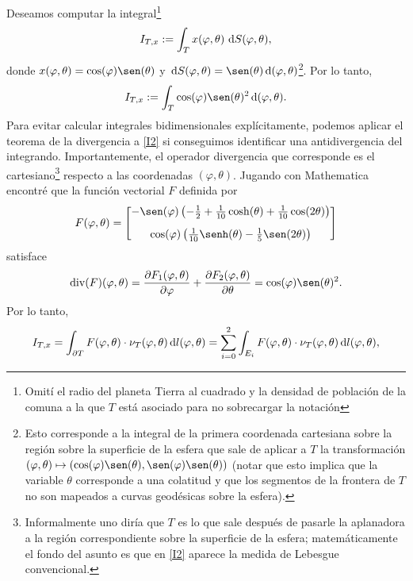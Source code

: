 \documentclass[reqno]{amsart}
\newcommand{\dd}[1][y]{\if#1y\,\fi{\mathrm d}} %
\begin{document}
Deseamos computar la integral\footnote{Omití el radio del planeta Tierra al cuadrado y la densidad de población de la comuna a la que $T$ está asociado para no sobrecargar la notación}
%
\begin{equation}\label{I1}
I_{T,x} := \int_T x(\varphi, \theta) \, \dd S(\varphi, \theta),
\end{equation}
%
donde $x(\varphi,\theta) = \cos(\varphi) \sen(\theta)$ y $\dd S(\varphi, \theta) = \sen(\theta) \dd(\varphi,\theta)$\footnote{Esto corresponde a la integral de la primera coordenada cartesiana sobre la región sobre la superficie de la esfera que sale de aplicar a $T$ la transformación $(\varphi, \theta) \mapsto (\cos(\varphi) \sen(\theta), \sen(\varphi) \sen(\theta))$ (notar que esto implica que la variable $\theta$ corresponde a una colatitud y que los segmentos de la frontera de $T$ no son mapeados a curvas geodésicas sobre la esfera).}.
Por lo tanto,
%
\begin{equation}\label{I2}
I_{T,x} := \int_T \cos(\varphi) \sen(\theta)^2 \dd(\varphi, \theta).
\end{equation}
%
Para evitar calcular integrales bidimensionales explícitamente, podemos aplicar el teorema de la divergencia a \eqref{I2} si conseguimos identificar una antidivergencia del integrando.
Importantemente, el operador divergencia que corresponde es el cartesiano\footnote{Informalmente uno diría que $T$ es lo que sale después de pasarle la aplanadora a la región correspondiente sobre la superficie de la esfera; matemáticamente el fondo del asunto es que en \eqref{I2} aparece la medida de Lebesgue convencional.} respecto a las coordenadas $(\varphi, \theta)$.
Jugando con Mathematica encontré que la función vectorial $F$ definida por
%
\begin{equation}\label{F}
F(\varphi, \theta) = \begin{bmatrix}
-\sen(\varphi) \left( -\frac{1}{2} + \frac{1}{10}\cosh(\theta) + \frac{1}{10}\cos(2\theta) \right)\\[2ex]
\cos(\varphi) \left( \frac{1}{10} \senh(\theta) - \frac{1}{5} \sen(2\theta) \right)
\end{bmatrix}
\end{equation}
%
satisface
%
\begin{equation*}
\operatorname{div}(F)(\varphi,\theta)
= \frac{\partial F_1(\varphi, \theta)}{\partial \varphi} + \frac{\partial F_2(\varphi, \theta)}{\partial \theta}
= \cos(\varphi) \sen(\theta)^2.
\end{equation*}
%
Por lo tanto,
%
\begin{equation}\label{I3}
I_{T,x} = \int_{\partial T} F(\varphi, \theta) \cdot \nu_T(\varphi,\theta) \dd l(\varphi, \theta)
= \sum_{i=0}^2 \int_{E_i} F(\varphi, \theta) \cdot \nu_T(\varphi,\theta) \dd l(\varphi, \theta),
\end{equation}
\end{document}
